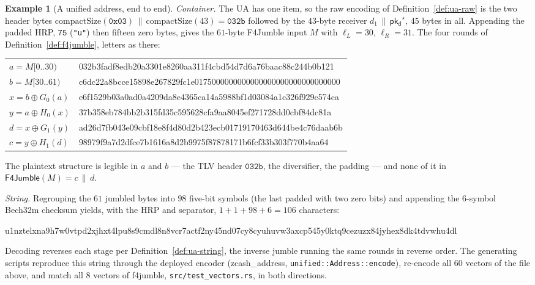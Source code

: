 \documentclass[11pt,a4paper]{article}
\theoremstyle{definition}
\newtheorem{example}[theorem]{Example}
\newcommand{\pkd}{\ensuremath{\mathsf{pk_d}}}
\begin{document}
\begin{example}[A unified address, end to end]
\emph{Container.} The UA has one item, so the raw encoding of
Definition~\ref{def:ua-raw} is the two header bytes
$\mathrm{compactSize}(\mathtt{0x03}) \,\|\, \mathrm{compactSize}(43) =
\mathtt{032b}$ followed by the $43$-byte receiver
$d_1 \,\|\, \pkd^\star$, $45$ bytes in all. Appending the padded HRP,
$\mathtt{75}$ (\texttt{"u"}) then fifteen zero bytes, gives the
$61$-byte F4Jumble input $M$ with $\ell_L = 30$, $\ell_R = 31$. The four
rounds of Definition~\ref{def:f4jumble}, letters as there:
\begin{center}\footnotesize\ttfamily
\begin{tabular}{@{}l@{\quad}l@{}}
$a = M[0..30)$ & 032b3fadf8edb20a3301e8260aa311f4cbd54d7d6a76baac88c244b0b121 \\
$b = M[30..61)$ & c6dc22a8bcce15898e267829fc1e0175000000000000000000000000000000 \\
$x = b \oplus G_0(a)$ & e6f1529b03a0ad0a4209da8e4365ca14a5988bf1d03084a1c326f929c574ca \\
$y = a \oplus H_0(x)$ & 37b358eb784bb2b315fd35c595628cfa9aa8045ef271728dd0cbf84dc81a \\
$d = x \oplus G_1(y)$ & ad26d7fb043e09cbf18e8f4d80d2b423ecb01719170463d644be4c76daab6b \\
$c = y \oplus H_1(d)$ & 98979f9a7d2dfce7b1616a8d2b9975f87878171b6fcf33b303f770b4aa64 \\
\end{tabular}
\end{center}
The plaintext structure is legible in $a$ and $b$ --- the TLV header
$\mathtt{032b}$, the diversifier, the padding --- and none of it in
$\mathsf{F4Jumble}(M) = c \,\|\, d$.

\emph{String.} Regrouping the $61$ jumbled bytes into $98$ five-bit
symbols (the last padded with two zero bits) and appending the
$6$-symbol Bech32m checksum yields, with the HRP and separator,
$1 + 1 + 98 + 6 = 106$ characters:
\begin{center}\scriptsize\ttfamily
u1nztelxna9h7w0vtpd2xjhxt4lpu8s9cmdl8n8vcr7actf2ny45nd07cy8cyuhuvw3axcp545y0ktq9cezuzx84jyhex8dk4tdvwhu4dl
\end{center}
Decoding reverses each stage per Definition~\ref{def:ua-string}, the
inverse jumble running the same rounds in reverse order. The generating
scripts reproduce this string through the deployed encoder
(\textsf{zcash\_address}, \texttt{unified::Address::encode}), re-encode
all $60$ vectors of the file above, and match all $8$ vectors of
\textsf{f4jumble}, \texttt{src/test\_vectors.rs}, in both directions.
\end{example}
\end{document}
